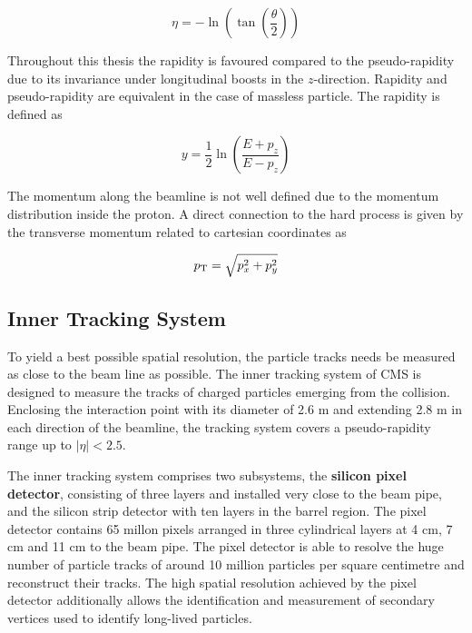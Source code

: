 \begin{equation}
    \eta = - \ln \left( \tan \left( \frac{\theta}{2} \right) \right)
\end{equation}

Throughout this thesis the rapidity is favoured compared to the pseudo-rapidity
due to its invariance under longitudinal boosts in the $z$-direction. Rapidity
and pseudo-rapidity are equivalent in the case of massless particle. The
rapidity is defined as

\begin{equation}
    y = \frac{1}{2} \ln \left( \frac{E + p_z}{E - p_z} \right) 
\end{equation}

The momentum along the beamline is not well defined due to the momentum
distribution inside the proton. A direct connection to the hard process is given
by the transverse momentum \pt related to cartesian coordinates as

\begin{equation}
    p_{\mathrm{T}} = \sqrt{p_x^2 + p_y^2}
\end{equation}

\subsection{Inner Tracking System}

To yield a best possible spatial resolution, the particle tracks needs be
measured as close to the beam line as possible. The inner tracking system of CMS
is designed to measure the tracks of charged particles emerging from the
collision. Enclosing the interaction point with its diameter of 2.6 m and
extending 2.8 m in each direction of the beamline, the tracking system covers a
pseudo-rapidity range up to $|\eta| < 2.5$. 

The inner tracking system comprises two subsystems, the \textbf{silicon pixel
detector}, consisting of three layers and installed very close to the beam pipe,
and the silicon strip detector with ten layers in the barrel region. The pixel
detector contains 65 millon pixels arranged in three cylindrical layers at 4 cm,
7 cm and 11 cm to the beam pipe. The pixel detector is able to resolve the huge
number of particle tracks of around 10 million particles per square centimetre
and reconstruct their tracks. The high spatial resolution achieved by the pixel
detector additionally allows the identification and measurement of secondary
vertices used to identify long-lived particles.

